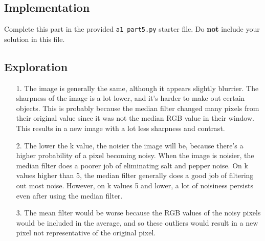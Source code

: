 \documentclass[fontsize=11pt]{article}
\begin{document}
\subsection*{Implementation}

Complete this part in the provided \texttt{a1\_part5.py} starter file.
Do \textbf{not} include your solution in this file.

\subsection*{Exploration}

\begin{enumerate}
\item[1.] The image is generally the same, although it appears slightly blurrier. The sharpness of the image is a lot lower, and it's harder to make out certain objects. This is probably because the median filter changed many pixels from their original value since it was not the median RGB value in their window. This results in a new image with a lot less sharpness and contrast.
\item[2.] The lower the k value, the noisier the image will be, because there's a higher probability of a pixel becoming noisy. When the image is noisier, the median filter does a poorer job of eliminating salt and pepper noise. On k values higher than 5, the median filter generally does a good job of filtering out most noise. However, on k values 5 and lower, a lot of noisiness persists even after using the median filter.
\item[3.] The mean filter would be worse because the RGB values of the noisy pixels would be included in the average, and so these outliers would result in a new pixel not representative of the original pixel.
\end{enumerate}
\end{document}
